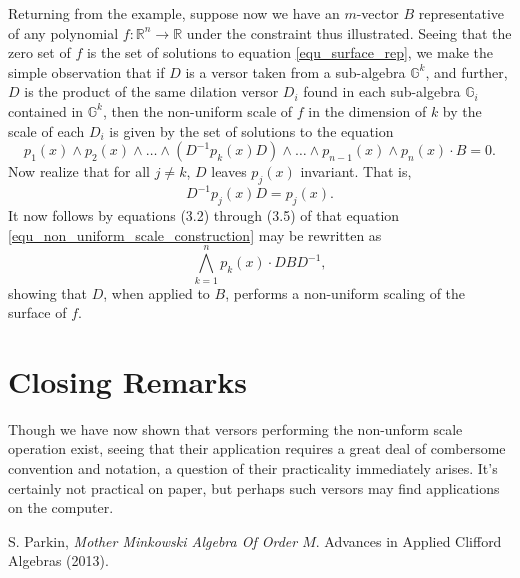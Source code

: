 \documentclass{birkjour}
\theoremstyle{definition}
\theoremstyle{remark}
\numberwithin{equation}{section}
\newcommand{\R}{\mathbb{R}}
\newcommand{\G}{\mathbb{G}}
\begin{document}
Returning from the example, suppose now we have an $m$-vector $B$ representative
of any polynomial $f:\R^n\to\R$ under the constraint thus illustrated.  Seeing that
the zero set of $f$ is the set of solutions to equation \eqref{equ_surface_rep},
we make the simple observation that if $D$ is a versor taken from a sub-algebra $\G^k$,
and further, $D$ is the product of the same dilation versor $D_i$ found in each sub-algebra
$\G_i$ contained in $\G^k$, then the non-uniform scale of $f$ in the dimension of $k$ by the scale of each
$D_i$ is given by the set of solutions to the equation
\begin{equation}\label{equ_non_uniform_scale_construction}
p_1(x)\wedge p_2(x)\wedge\dots\wedge (D^{-1}p_k(x)D)\wedge\dots\wedge p_{n-1}(x)\wedge p_n(x)\cdot B=0.
\end{equation}
Now realize that for all $j\neq k$, $D$ leaves $p_j(x)$ invariant.  That is,
\begin{equation*}
D^{-1}p_j(x)D=p_j(x).
\end{equation*}
It now follows by equations (3.2) through (3.5) of \cite{Parkin13} that equation \eqref{equ_non_uniform_scale_construction}
may be rewritten as
\begin{equation*}
\bigwedge_{k=1}^n p_k(x)\cdot DBD^{-1},
\end{equation*}
showing that $D$, when applied to $B$, performs a non-uniform scaling of the surface of $f$.

\section{Closing Remarks}

Though we have now shown that versors performing the non-unform scale operation
exist, seeing that their application requires a great deal of combersome convention and notation,
a question of their practicality immediately arises.  It's certainly not practical on paper, but
perhaps such versors may find applications on the computer.

\begin{thebibliography}{9}

S. Parkin, {\it Mother Minkowski Algebra Of Order $M$}.
Advances in Applied Clifford Algebras (2013).

\end{thebibliography}
\end{document}
